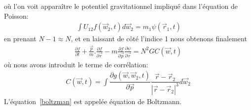 où l'on voit apparaître le potentiel gravitationnel impliqué dans l'équation de Poisson:
\begin{align*}
	\displaystyle{\ \int U_{12}f\left(  \vec{w}_{2},t\right)  d\vec{w}_{2}=m_{1}\psi\left(  \vec{r}_{1},t\right)  }%
\end{align*}
en prenant $N-1\approx N$, et en laissant de côté l'indice 1 nous obtenons finalement
\begin{align}
	\frac{\partial f}{\partial t}+\frac{\vec{p}}{m}.\frac{\partial f}{\partial\vec{r}}-m\frac{\partial f}{\partial\vec{p}}\frac{\partial\psi
	}{\partial\vec{r}}=N^{2}GC\left(  \vec{w},t\right)  \label{boltzman}%
\end{align}
où nous avons introduit le terme de corrélation:
\begin{align*}
	C\left(  \vec{w},t\right)  =\displaystyle\int\dfrac{\partial g\left(\vec{w},\vec{w}_{2},t\right)  }{\partial\vec{p}}\dfrac{\vec{r}%
	-\vec{r}_{2}}{\left\vert \vec{r}-\vec{r}_{2}\right\vert ^{3}}d\vec{w}_{2}%
\end{align*}
L'équation~\ref{boltzman} est appelée équation de Boltzmann.

